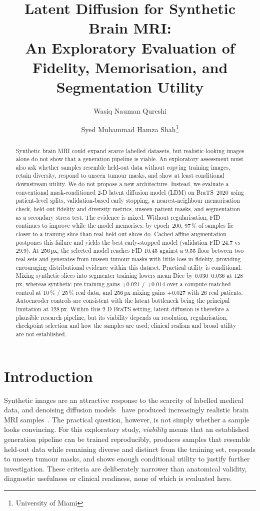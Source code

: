 \documentclass[10pt,a4paper]{article}
\title{Latent Diffusion for Synthetic Brain MRI:\\An Exploratory Evaluation of Fidelity, Memorisation, and Segmentation Utility}
\author{Wasiq Nauman Qureshi\and Syed Muhammad Hamza Shah\thanks{University of Miami}}
\date{}
\begin{document}
\maketitle

\begin{abstract}
Synthetic brain MRI could expand scarce labelled datasets, but realistic-looking images alone do not show that a generation pipeline is viable. An exploratory assessment must also ask whether samples resemble held-out data without copying training images, retain diversity, respond to unseen tumour masks, and show at least conditional downstream utility. We do not propose a new architecture. Instead, we evaluate a conventional mask-conditioned 2-D latent diffusion model (LDM) on BraTS~2020 using patient-level splits, validation-based early stopping, a nearest-neighbour memorisation check, held-out fidelity and diversity metrics, unseen-patient masks, and segmentation as a secondary stress test. The evidence is mixed. Without regularisation, FID continues to improve while the model memorises: by epoch~200, 97\,\% of samples lie closer to a training slice than real held-out slices do. Cached affine augmentation postpones this failure and yields the best early-stopped model (validation FID 24.7 vs 29.9). At 256\,px, the selected model reaches FID 10.45 against a 9.55 floor between two real sets and generates from unseen tumour masks with little loss in fidelity, providing encouraging distributional evidence within this dataset. Practical utility is conditional. Mixing synthetic slices into segmenter training lowers mean Dice by $0.030$--$0.036$ at 128\,px, whereas synthetic pre-training gains $+0.021$ / $+0.014$ over a compute-matched control at 10\,\% / 25\,\% real data, and 256\,px mixing gains $+0.027$ with 26 real patients. Autoencoder controls are consistent with the latent bottleneck being the principal limitation at 128\,px. Within this 2-D BraTS setting, latent diffusion is therefore a plausible research pipeline, but its viability depends on resolution, regularisation, checkpoint selection and how the samples are used; clinical realism and broad utility are not established.
\end{abstract}

\section{Introduction}
Synthetic images are an attractive response to the scarcity of labelled medical data, and denoising diffusion models~\citep{ho2020ddpm,rombach2022ldm} have produced increasingly realistic brain MRI samples~\citep{pinaya2022brain,khader2023ddpm3d,kazerouni2023survey}. The practical question, however, is not simply whether a sample looks convincing. For this exploratory study, \emph{viability} means that an established generation pipeline can be trained reproducibly, produces samples that resemble held-out data while remaining diverse and distinct from the training set, responds to unseen tumour masks, and shows enough conditional utility to justify further investigation. These criteria are deliberately narrower than anatomical validity, diagnostic usefulness or clinical readiness, none of which is evaluated here.
\end{document}
